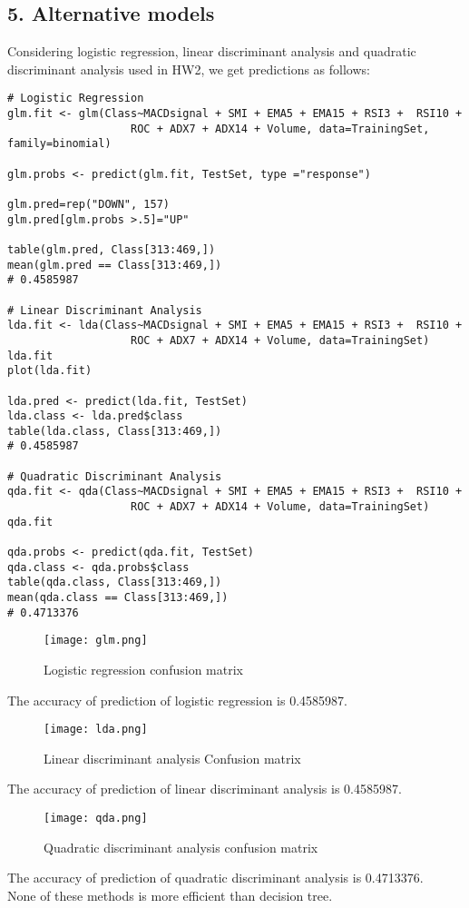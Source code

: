 \documentclass{article}
\begin{document}
\subsection*{5. Alternative models}
Considering logistic regression, linear discriminant analysis and quadratic discriminant analysis used in HW2, we get predictions as follows: \\
\begin{verbatim}
# Logistic Regression
glm.fit <- glm(Class~MACDsignal + SMI + EMA5 + EMA15 + RSI3 +  RSI10 + 
                   ROC + ADX7 + ADX14 + Volume, data=TrainingSet, family=binomial)

glm.probs <- predict(glm.fit, TestSet, type ="response")

glm.pred=rep("DOWN", 157)
glm.pred[glm.probs >.5]="UP"

table(glm.pred, Class[313:469,])
mean(glm.pred == Class[313:469,])
# 0.4585987

# Linear Discriminant Analysis
lda.fit <- lda(Class~MACDsignal + SMI + EMA5 + EMA15 + RSI3 +  RSI10 + 
                   ROC + ADX7 + ADX14 + Volume, data=TrainingSet)
lda.fit
plot(lda.fit)

lda.pred <- predict(lda.fit, TestSet)
lda.class <- lda.pred$class
table(lda.class, Class[313:469,])
# 0.4585987

# Quadratic Discriminant Analysis
qda.fit <- qda(Class~MACDsignal + SMI + EMA5 + EMA15 + RSI3 +  RSI10 + 
                   ROC + ADX7 + ADX14 + Volume, data=TrainingSet)
qda.fit

qda.probs <- predict(qda.fit, TestSet)
qda.class <- qda.probs$class
table(qda.class, Class[313:469,])
mean(qda.class == Class[313:469,])
# 0.4713376
\end{verbatim}

\begin{figure}[H] 
\begin{center} 
\texttt{[image: glm.png]}  
\caption{Logistic regression confusion matrix} 
\label{} 
\end{center} 
\end{figure}
The accuracy of prediction of logistic regression is 0.4585987.
\begin{figure}[H] 
\begin{center} 
\texttt{[image: lda.png]}  
\caption{Linear discriminant analysis Confusion matrix} 
\label{} 
\end{center} 
\end{figure}
The accuracy of prediction of linear discriminant analysis is 0.4585987.
\begin{figure}[H] 
\begin{center} 
\texttt{[image: qda.png]}  
\caption{Quadratic discriminant analysis confusion matrix} 
\label{} 
\end{center} 
\end{figure}
The accuracy of prediction of quadratic discriminant analysis is 0.4713376. \\
\indent None of these methods is more efficient than decision tree.
\end{document}
